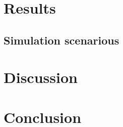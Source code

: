 \documentclass{scrartcl}\usepackage[]{graphicx}\usepackage[]{color}
\begin{document}
\section{Results}
\subsection{Simulation scenarious}



\section{Discussion}


\section{Conclusion}



\end{document}
